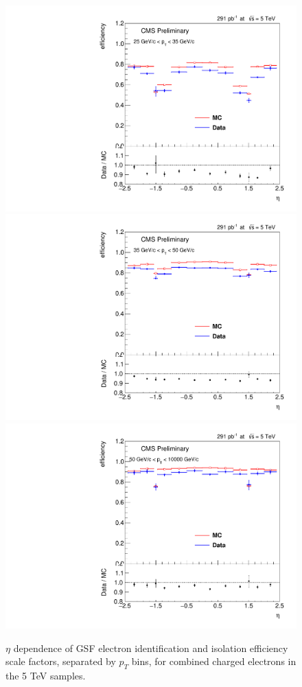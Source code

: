 \begin{figure}
\centering
\includegraphics[width=0.48\linewidth]{plots/efficiency/5_zeegsfsel_combined/PtBins_eta_pt0.pdf}
\includegraphics[width=0.48\linewidth]{plots/efficiency/5_zeegsfsel_combined/PtBins_eta_pt1.pdf}
\includegraphics[width=0.48\linewidth]{plots/efficiency/5_zeegsfsel_combined/PtBins_eta_pt2.pdf}
\caption{$\eta$ dependence of GSF electron identification and isolation efficiency scale factors, separated by $p_T$ bins, for combined charged electrons in the 5 TeV samples.}
\label{fig:Eff:el:5:GSFSel:com}
\end{figure}
